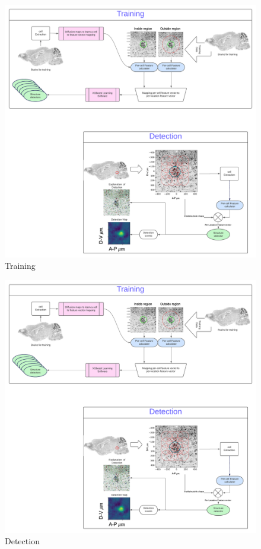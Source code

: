 \documentclass[runningheads]{llncs}
\begin{document}
\begin{figure}[t]
  \includegraphics[width=\textwidth]{figures/Training.pdf}
  \caption{Training}
\end{figure}
\begin{figure}[t]
  \includegraphics[width=\textwidth]{figures/detection.pdf}
  \caption{Detection}
\end{figure}
\end{document}
